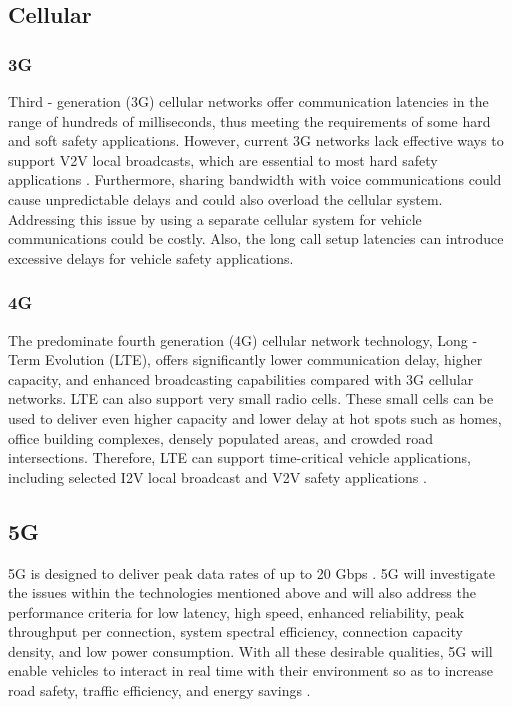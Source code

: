\documentclass[12pt]{report}
\begin{document}
	\subsection{Cellular}
		\subsubsection{3G}
		Third - generation (3G) cellular networks offer communication latencies in
		the range of hundreds of milliseconds, thus meeting the requirements of some
		hard and soft safety applications. However, current 3G networks lack effective ways to support V2V local broadcasts, which are essential to most hard safety
		applications \cite{protocols}. Furthermore, sharing bandwidth with voice communications
		could cause unpredictable delays and could also overload the cellular system.
		Addressing this issue by using a separate cellular system for vehicle communications
		could be costly. Also, the long call setup latencies can introduce
		excessive delays for vehicle safety applications.
		
		\subsubsection{4G}
		The predominate fourth generation (4G) cellular network technology,	Long - Term Evolution (LTE), offers significantly lower communication delay, higher capacity, and enhanced broadcasting capabilities compared with 3G cellular networks. LTE can also support very small radio cells. These small cells can be used to deliver even higher capacity and lower delay at hot spots such as
		homes, office building complexes, densely populated areas, and crowded road intersections. Therefore, LTE can support time-critical vehicle applications, including selected I2V local broadcast and V2V safety applications \cite{protocols}.
		
		\subsection{5G}
		5G is designed to deliver peak data rates of up to 20 Gbps \cite{qualcomm}. 5G will investigate the issues within the technologies mentioned above and will also address the performance criteria for low latency, high speed, enhanced reliability, peak throughput per connection, system spectral efficiency, connection capacity density, and low power consumption. With all these desirable qualities, 5G  will enable vehicles to interact in real time with their environment so as to increase road safety, traffic efficiency, and energy savings \cite{protocols}.
\end{document}
